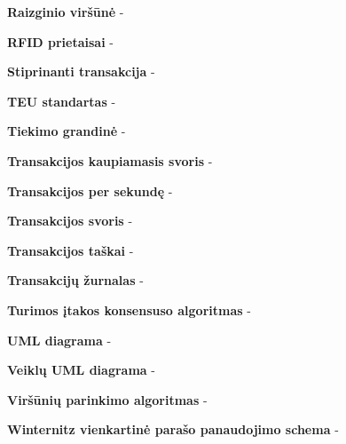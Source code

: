 \noindent \textbf{Raizginio viršūnė} -

\noindent \textbf{RFID prietaisai} -

\noindent \textbf{Stiprinanti transakcija} -

\noindent \textbf{TEU standartas} -

\noindent \textbf{Tiekimo grandinė} -

\noindent \textbf{Transakcijos kaupiamasis svoris} -

\noindent \textbf{Transakcijos per sekundę} -

\noindent \textbf{Transakcijos svoris} -

\noindent \textbf{Transakcijos taškai} -

\noindent \textbf{Transakcijų žurnalas} -

\noindent \textbf{Turimos įtakos konsensuso algoritmas} -

\noindent \textbf{UML diagrama} -

\noindent \textbf{Veiklų UML diagrama} -

\noindent \textbf{Viršūnių parinkimo algoritmas} -

\noindent \textbf{Winternitz vienkartinė parašo panaudojimo schema} -
